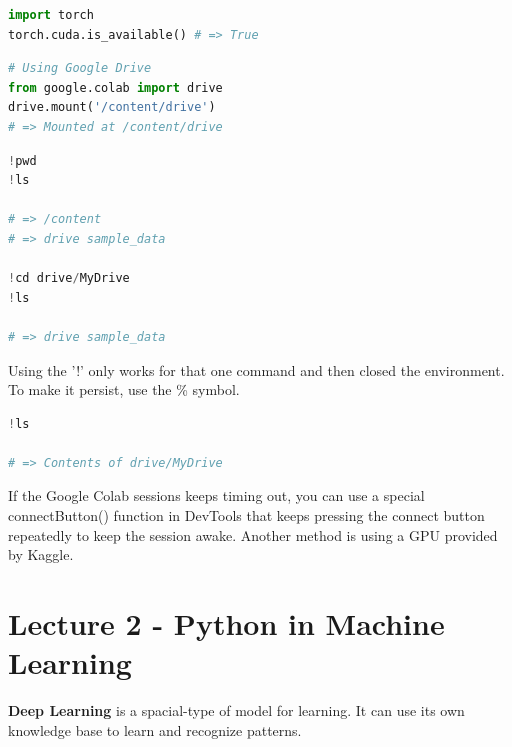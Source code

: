 {\vspace{11pt}
\begin{lstlisting}[language=Python, breaklines=true]
import torch
torch.cuda.is_available() # => True  
\end{lstlisting}
\vspace{11pt}

\vspace{11pt}
\begin{lstlisting}[language=Python, breaklines=true]
# Using Google Drive
from google.colab import drive
drive.mount('/content/drive')
# => Mounted at /content/drive
\end{lstlisting}
\vspace{11pt}

\vspace{11pt}
\begin{lstlisting}[language=Python, breaklines=true]
!pwd
!ls

# => /content
# => drive sample_data

!cd drive/MyDrive
!ls

# => drive sample_data
\end{lstlisting}
\vspace{11pt}

Using the '!' only works for that one command and then closed the environment. To make it persist, use the \% symbol.

\vspace{11pt}
\begin{lstlisting}[language=Python, breaklines=true]
%cd drive/MyDrive
!ls

# => Contents of drive/MyDrive
\end{lstlisting}
\vspace{11pt}

If the Google Colab sessions keeps timing out, you can use a special connectButton() function in DevTools that keeps pressing the connect button repeatedly to keep the session awake. Another method is using a GPU provided by Kaggle.

\vspace{11pt}
\section{Lecture 2 - Python in Machine Learning}
\vspace{11pt}

\textbf{Deep Learning} is a spacial-type of model for learning. It can use its own knowledge base to learn and recognize patterns.

}
